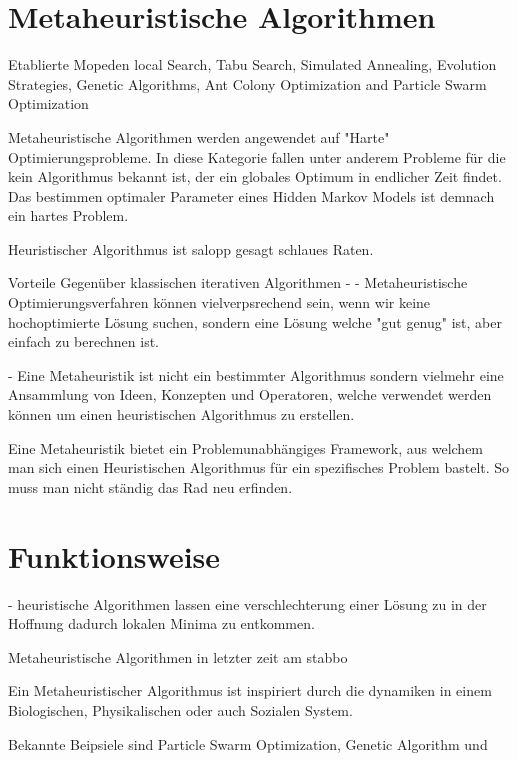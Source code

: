 \section{Metaheuristische Algorithmen}

Etablierte Mopeden local Search, Tabu Search, Simulated Annealing, Evolution Strategies, Genetic Algorithms, Ant Colony Optimization and Particle Swarm Optimization

Metaheuristische Algorithmen werden angewendet auf "Harte" Optimierungsprobleme.
In diese Kategorie fallen unter anderem Probleme für die kein Algorithmus 
bekannt ist, der ein globales Optimum in endlicher Zeit findet.~\cite*{metaheuristics}
Das bestimmen optimaler Parameter eines Hidden Markov Models ist demnach ein hartes Problem.

Heuristischer Algorithmus ist salopp gesagt schlaues Raten.

Vorteile Gegenüber klassischen iterativen Algorithmen
- 
- Metaheuristische Optimierungsverfahren können vielverpsrechend sein, wenn wir 
keine hochoptimierte Lösung suchen, sondern eine Lösung welche "gut genug"
ist, aber einfach zu berechnen ist. \cite{metaheuristics&evolcomp}

- Eine Metaheuristik ist nicht ein bestimmter Algorithmus sondern vielmehr 
eine Ansammlung von Ideen, Konzepten und Operatoren, welche verwendet werden können 
um einen heuristischen Algorithmus zu erstellen.~\cite*{MetaheuristicsExposed}

Eine Metaheuristik bietet ein Problemunabhängiges Framework, aus welchem man 
sich einen Heuristischen Algorithmus für ein spezifisches Problem bastelt. So muss 
man nicht ständig das Rad neu erfinden.

\section{Funktionsweise}
- heuristische Algorithmen lassen eine verschlechterung einer Lösung zu
in der Hoffnung dadurch lokalen Minima zu entkommen. \cite*{metaheuristics}

Metaheuristische Algorithmen in letzter zeit am stabbo

Ein Metaheuristischer Algorithmus ist inspiriert durch die dynamiken in einem Biologischen, Physikalischen
oder auch Sozialen System.

Bekannte Beipsiele sind Particle Swarm Optimization, Genetic Algorithm 
und 


